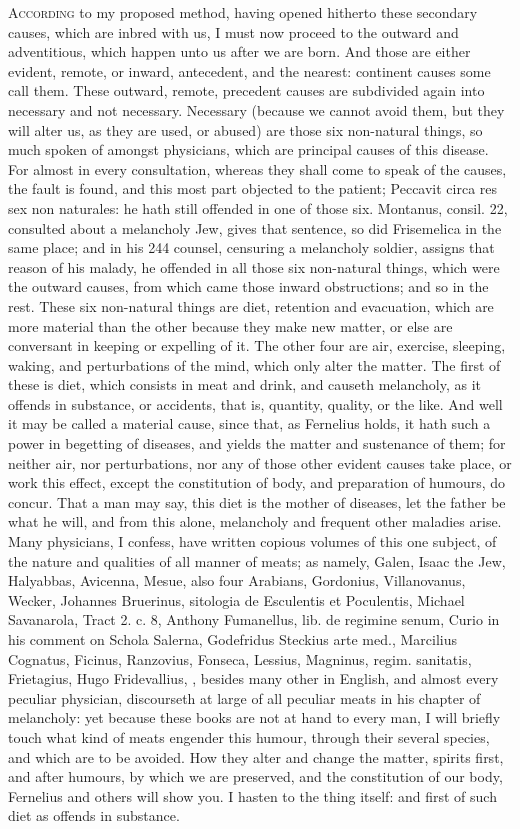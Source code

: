 {\lettrine{A}{ccording} to my proposed method, having opened hitherto these secondary
causes, which are inbred with us, I must now proceed to the outward and
adventitious, which happen unto us after we are born. And those are
either evident, remote, or inward, antecedent, and the nearest:
continent causes some call them. These outward, remote, precedent
causes are subdivided again into necessary and not necessary. Necessary
(because we cannot avoid them, but they will alter us, as they are
used, or abused) are those six non-natural things, so much spoken of
amongst physicians, which are principal causes of this disease. For
almost in every consultation, whereas they shall come to speak of the
causes, the fault is found, and this most part objected to the patient;
Peccavit circa res sex non naturales: he hath still offended in one of
those six. Montanus, consil. 22, consulted about a melancholy Jew,
gives that sentence, so did Frisemelica in the same place; and in his
244 counsel, censuring a melancholy soldier, assigns that reason of his
malady, he offended in all those six non-natural things, which
were the outward causes, from which came those inward obstructions; and
so in the rest.
These six non-natural things are diet, retention and evacuation, which
are more material than the other because they make new matter, or else
are conversant in keeping or expelling of it. The other four are air,
exercise, sleeping, waking, and perturbations of the mind, which only
alter the matter. The first of these is diet, which consists in meat
and drink, and causeth melancholy, as it offends in substance, or
accidents, that is, quantity, quality, or the like. And well it may be
called a material cause, since that, as Fernelius holds, it hath
such a power in begetting of diseases, and yields the matter and
sustenance of them; for neither air, nor perturbations, nor any of
those other evident causes take place, or work this effect, except the
constitution of body, and preparation of humours, do concur. That a man
may say, this diet is the mother of diseases, let the father be what he
will, and from this alone, melancholy and frequent other maladies
arise. Many physicians, I confess, have written copious volumes of this
one subject, of the nature and qualities of all manner of meats; as
namely, Galen, Isaac the Jew, Halyabbas, Avicenna, Mesue, also four
Arabians, Gordonius, Villanovanus, Wecker, Johannes Bruerinus,
sitologia de Esculentis et Poculentis, Michael Savanarola, Tract 2. c.
8, Anthony Fumanellus, lib. de regimine senum, Curio in his comment on
Schola Salerna, Godefridus Steckius arte med., Marcilius Cognatus,
Ficinus, Ranzovius, Fonseca, Lessius, Magninus, regim. sanitatis,
Frietagius, Hugo Fridevallius, \etc{}, besides many other in
English, and almost every peculiar physician, discourseth at
large of all peculiar meats in his chapter of melancholy: yet because
these books are not at hand to every man, I will briefly touch what
kind of meats engender this humour, through their several species, and
which are to be avoided. How they alter and change the matter, spirits
first, and after humours, by which we are preserved, and the
constitution of our body, Fernelius and others will show you. I hasten
to the thing itself: and first of such diet as offends in substance.
}

